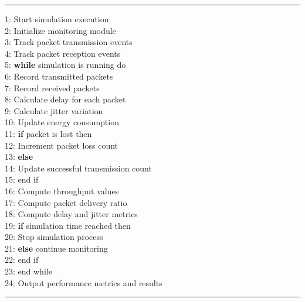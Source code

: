 \documentclass[a4paper,fleqn]{cas-dc}
\numberwithin{equation}{section}
\begin{document}
\noindent\rule{\linewidth}{0.5pt}
\hspace{0.5cm}1: Start simulation execution \\
\hspace{0.5cm}2: Initialize monitoring module \\
\hspace{0.5cm}3: Track packet transmission events \\
\hspace{0.5cm}4: Track packet reception events \\
\hspace{0.5cm}5: \textbf{while} simulation is running do \\
\hspace{0.5cm}6: Record transmitted packets \\
\hspace{0.5cm}7: Record received packets \\
\hspace{0.5cm}8: Calculate delay for each packet \\
\hspace{0.5cm}9: Calculate jitter variation \\
\hspace{0.5cm}10: Update energy consumption \\
\hspace{0.5cm}11: \textbf{if} packet is lost then \\
\hspace{0.5cm}12: Increment packet loss count \\
\hspace{0.5cm}13: \textbf{else} \\
\hspace{0.5cm}14: Update successful transmission count \\
\hspace{0.5cm}15: end if \\
\hspace{0.5cm}16: Compute throughput values \\
\hspace{0.5cm}17: Compute packet delivery ratio \\
\hspace{0.5cm}18: Compute delay and jitter metrics \\
\hspace{0.5cm}19: \textbf{if} simulation time reached then \\
\hspace{0.5cm}20: Stop simulation process \\
\hspace{0.5cm}21: \textbf{else} continue monitoring \\
\hspace{0.5cm}22: end if \\
\hspace{0.5cm}23: end while \\
\hspace{0.5cm}24: Output performance metrics and results \\
\noindent\rule{\linewidth}{0.5pt}
\end{document}
